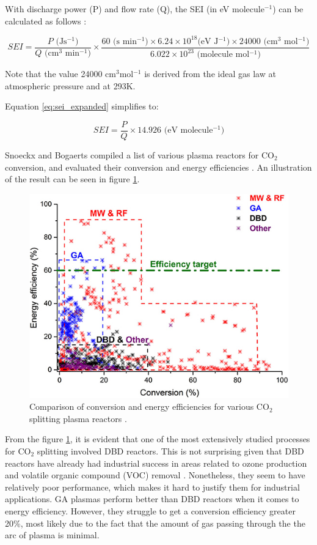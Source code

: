 With discharge power (P) and flow rate (Q), the SEI (in eV molecule$^{-1}$) can be calculated as follows \cite{Ozkan2015}:

\begin{equation}
    SEI = \frac{P \text{ (Js$^{-1}$)}}{Q \text{ (cm$^{3}$ min$^{-1}$)}} \times \frac{60 \text{ (s min$^{-1}$)} \times 6.24 \times 10^{18} \text{(eV J$^{-1}$)} \times 24000 \text{ (cm$^{3}$ mol$^{-1}$)}}{6.022 \times 10^{23} \text{ (molecule mol$^{-1}$)}} 
    \label{eq:sei_expanded}
\end{equation}

Note that the value 24000 cm$^{3}$mol$^{-1}$ is derived from the ideal gas law at atmospheric pressure and at 293K. 

Equation \ref{eq:sei_expanded} simplifies to:

\begin{equation}
    SEI = \frac{P}{Q} \times 14.926 \text{ (eV molecule$^{-1}$)}
    \label{eq:sei}
\end{equation}

Snoeckx and Bogaerts compiled a list of various plasma reactors for CO$_2$ conversion, and evaluated their conversion and energy efficiencies \cite{Snoeckx2017}. An illustration of the result can be seen in figure \ref{fig:conversion_and_energy_efficiencies}. 

\begin{figure}[h!]
	\centering
	\includegraphics[width=0.7\linewidth]{chapter_3/figures/conversion_and_energy_efficiencies.jpg}
	\caption{Comparison of conversion and energy efficiencies for various CO$_2$ splitting plasma reactors \cite{Snoeckx2017}.}
	\label{fig:conversion_and_energy_efficiencies}
\end{figure}

From the figure \ref{fig:conversion_and_energy_efficiencies}, it is evident that one of the most extensively studied processes for CO$_2$ splitting involved DBD reactors. This is not surprising given that DBD reactors have already had industrial success in areas related to ozone production and volatile organic compound (VOC) removal \cite{Kogelschatz2003}. Nonetheless, they seem to have relatively poor performance, which makes it hard to justify them for industrial applications. GA plasmas perform better than DBD reactors when it comes to energy efficiency. However, they struggle to get a conversion efficiency greater 20\%, most likely due to the fact that the amount of gas passing through the the arc of plasma is minimal.

